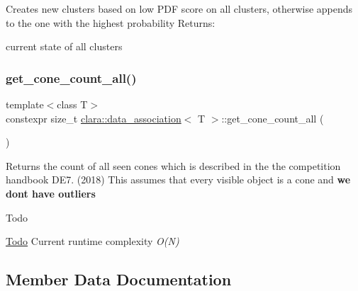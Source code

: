 Creates new clusters based on low P\+DF score on all clusters, otherwise appends to the one with the highest probability Returns\+: 


\begin{DoxyItemize}
\item current state of all clusters 
\end{DoxyItemize}\mbox{\label{classclara_1_1data__association_a0107c7f137ed245fec1818aa9c7f63d5}} 
\subsubsection{\texorpdfstring{get\+\_\+cone\+\_\+count\+\_\+all()}{get\_cone\_count\_all()}}
{\footnotesize\ttfamily template$<$class T$>$ \\
constexpr size\+\_\+t \hyperlink{classclara_1_1data__association}{clara\+::data\+\_\+association}$<$ T $>$\+::get\+\_\+cone\+\_\+count\+\_\+all (\begin{DoxyParamCaption}{ }\end{DoxyParamCaption})\hspace{0.3cm}{\ttfamily [inline]}}



Returns the count of all seen cones which is described in the the competition handbook D\+E7. (2018) This assumes that every visible object is a cone and {\bfseries we don\textquotesingle{}t have outliers} 

\begin{DoxyRefDesc}{Todo}
\item[\hyperlink{todo__todo000011}{Todo}]Current runtime complexity {\itshape O(\+N)} \end{DoxyRefDesc}


\subsection{Member Data Documentation}
\mbox{\label{classclara_1_1data__association_aa6fa8a0a838466029189534c94ce1443}} 
